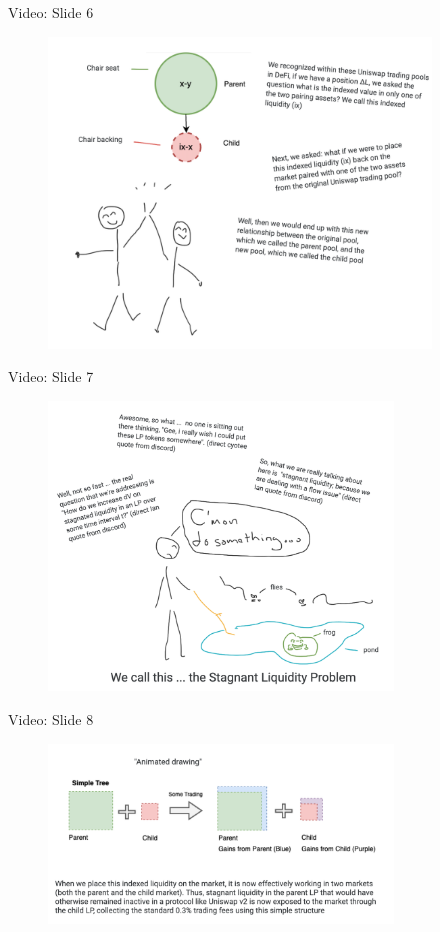 \documentclass[10pt,xcolor=svgnames]{beamer} %
\begin{document}
\begin{frame}{Video: Slide 6}
\begin{figure}[h!]
\includegraphics[width=4in]{img/slide6.png}
\label{fig:dex_forest}
\end{figure}
\end{frame}

\begin{frame}{Video: Slide 7}
\begin{figure}[h!]
\includegraphics[width=3.6in]{img/slide7.png}
\label{fig:dex_forest}
\end{figure}
\end{frame}

\begin{frame}{Video: Slide 8}
\begin{figure}[h!]
\includegraphics[width=3.6in]{img/slide8.png}
\label{fig:dex_forest}
\end{figure}
\end{frame}
\end{document}
